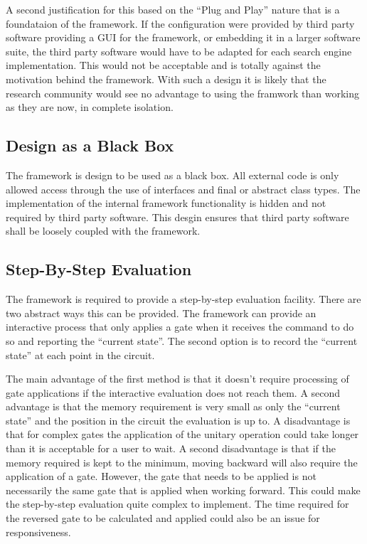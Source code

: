 A second justification for this based on the ``Plug and Play'' nature that is a foundataion of the framework.
If the configuration were provided by third party software providing a GUI for the framework, or embedding it in a larger software suite, the third party software would have to be adapted for each search engine implementation.
This would not be acceptable and is totally against the motivation behind the framework.
With such a design it is likely that the research community would see no advantage to using the framwork than working as they are now, in complete isolation.


\subsection{Design as a Black Box}
The framework is design to be used as a black box.
All external code is only allowed access through the use of interfaces and final or abstract class types.
The implementation of the internal framework functionality is hidden and not required by third party software.
This desgin ensures that third party software shall be loosely coupled with the framework.

\subsection{Step-By-Step Evaluation}
The framework is required to provide a step-by-step evaluation facility.
There are two abstract ways this can be provided.
The framework can provide an interactive process that only applies a gate when it receives the command to do so and reporting the ``current state''.
The second option is to record the ``current state'' at each point in the circuit.

The main advantage of the first method is that it doesn't require processing of gate applications if the interactive evaluation does not reach them.
A second advantage is that the memory requirement is very small as only the ``current state'' and the position in the circuit the evaluation is up to.
A disadvantage is that for complex gates the application of the unitary operation could take longer than it is acceptable for a user to wait.
A second disadvantage is that if the memory required is kept to the minimum, moving backward will also require the application of a gate.
However, the gate that needs to be applied is not necessarily the same gate that is applied when working forward.
This could make the step-by-step evaluation quite complex to implement.
The time required for the reversed gate to be calculated and applied could also be an issue for responsiveness.


